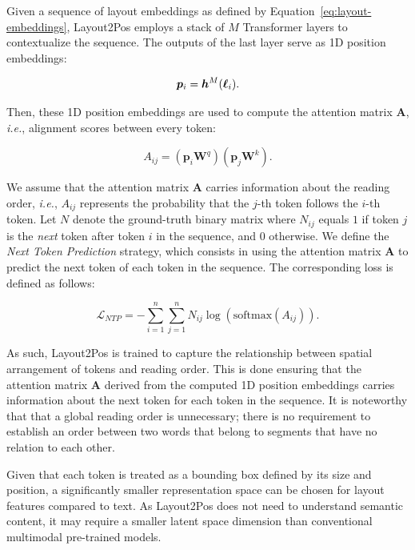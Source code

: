 Given a sequence of layout embeddings as defined by Equation~\ref{eq:layout-embeddings}, Layout2Pos employs a stack of $M$ Transformer layers to contextualize the sequence. The outputs of the last layer serve as 1D position embeddings:

\begin{equation}
  \bm{p}_i = \bm{h}^M(\boldsymbol{\ell}_i).
\end{equation}

\noindent Then, these 1D position embeddings are used to compute the attention matrix $\bm{A}$, \textit{i.e.}, alignment scores between every token:

\begin{equation}
  A_{ij} = \left(\bm{p}_i \bm{W}^q\right)\left(\bm{p}_j \bm{W}^k\right).
\end{equation}

\noindent We assume that the attention matrix $\bm{A}$ carries information about the reading order, \textit{i.e.}, $A_{ij}$ represents the probability that the $j$-th token follows the $i$-th token. Let $N$ denote the ground-truth binary matrix where $N_{ij}$ equals $1$ if token $j$ is the \textit{next} token after token $i$ in the sequence, and $0$ otherwise. We define the \textit{Next Token Prediction} strategy, which consists in using the attention matrix $\bm{A}$ to predict the next token of each token in the sequence. The corresponding loss is defined as follows:

\begin{equation}
  \mathcal{L}_{NTP} = - \sum_{i=1}^n \sum_{j=1}^n N_{ij} \log\left(\textrm{softmax}(A_{ij})\right).
\end{equation}

\noindent As such, Layout2Pos is trained to capture the relationship between spatial arrangement of tokens and reading order. This is done ensuring that the attention matrix $\bm{A}$ derived from the computed 1D position embeddings carries information about the next token for each token in the sequence. It is noteworthy that that a global reading order is unnecessary; there is no requirement to establish an order between two words that belong to segments that have no relation to each other.

Given that each token is treated as a bounding box defined by its size and position, a significantly smaller representation space can be chosen for layout features compared to text. As Layout2Pos does not need to understand semantic content, it may require a smaller latent space dimension than conventional multimodal pre-trained models. 

